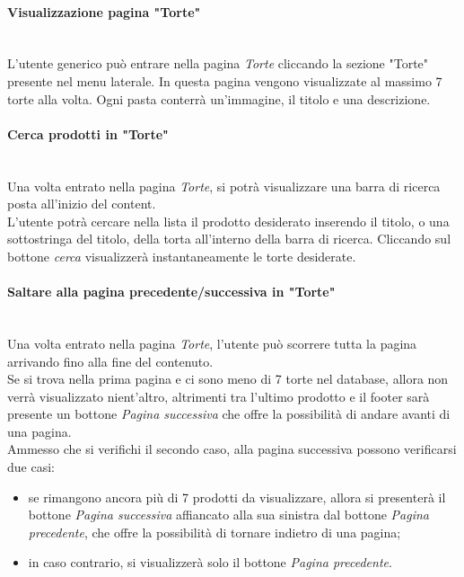 \paragraph{Visualizzazione pagina "Torte"}\mbox{}\\
\label{par:VisTorte}
L'utente generico può entrare nella pagina \emph{Torte} cliccando la sezione "Torte" presente nel menu laterale.
In questa pagina vengono visualizzate al massimo 7 torte alla volta. Ogni pasta conterrà un'immagine, il titolo e una descrizione.\\

\paragraph{Cerca prodotti in "Torte"}\mbox{}\\
\label{par:CerTorte}
Una volta entrato nella pagina \emph{Torte}, si potrà visualizzare una barra di ricerca posta all'inizio del content.\\
L'utente potrà cercare nella lista il prodotto desiderato inserendo il titolo, o una sottostringa del titolo, della torta all'interno della barra di ricerca. Cliccando sul bottone \emph{cerca} visualizzerà instantaneamente le torte desiderate.

\paragraph{Saltare alla pagina precedente/successiva in "Torte"}\mbox{}\\
\label{par:PrevNextTorte}
Una volta entrato nella pagina \emph{Torte}, l'utente può scorrere tutta la pagina arrivando fino alla fine del contenuto.\\
Se si trova nella prima pagina e ci sono meno di 7 torte nel database, allora non verrà visualizzato nient'altro, altrimenti tra l'ultimo prodotto e il footer sarà presente un bottone \emph{Pagina successiva} che offre la possibilità di andare avanti di una pagina.\\
Ammesso che si verifichi il secondo caso, alla pagina successiva possono verificarsi due casi:
\begin{itemize}
	\item se rimangono ancora più di 7 prodotti da visualizzare, allora si presenterà il bottone \emph{Pagina successiva} affiancato alla sua sinistra dal bottone \emph{Pagina precedente}, che offre la possibilità di tornare indietro di una pagina;
	\item in caso contrario, si visualizzerà solo il bottone \emph{Pagina precedente}.
\end{itemize}	

